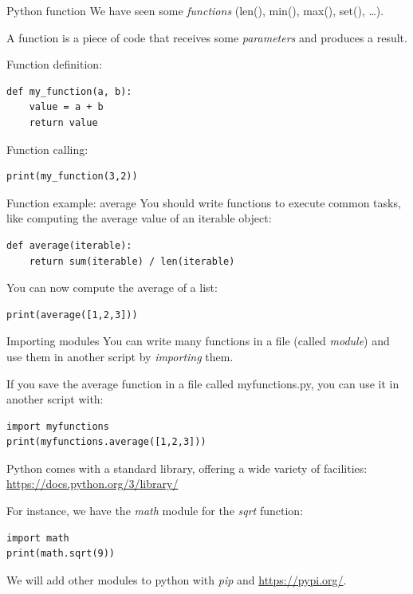 \documentclass[aspectratio=169,handout]{beamer}
\begin{document}
\begin{frame}[fragile]{Python function}
    We have seen some \emph{functions} (len(), min(), max(), set(), \ldots).

    A function is a piece of code that receives some \emph{parameters} and produces a result.

    \begin{minipage}{0.49\textwidth}
        Function definition:
        \begin{verbatim}
def my_function(a, b):
    value = a + b
    return value
        \end{verbatim}
    \end{minipage}
    \begin{minipage}{0.49\textwidth}
        Function calling:
        \begin{verbatim}
print(my_function(3,2))
        \end{verbatim}
    \end{minipage}
\end{frame}

\begin{frame}[fragile]{Function example: average}
    You should write functions to execute common tasks, like computing the average value of an iterable object:

        \begin{verbatim}
def average(iterable):
    return sum(iterable) / len(iterable)
        \end{verbatim}

        You can now compute the average of a list:
        \begin{verbatim}
print(average([1,2,3]))
        \end{verbatim}
\end{frame}

\begin{frame}[fragile]{Importing modules}
    You can write many functions in a file (called \emph{module}) and use them in another script by \emph{importing}
    them.

    If you save the average function in a file called myfunctions.py, you can use it in another script with:
    \begin{verbatim}
import myfunctions
print(myfunctions.average([1,2,3]))
    \end{verbatim}

    Python comes with a standard library, offering a wide variety of facilities:
    \url{https://docs.python.org/3/library/}

    For instance, we have the \emph{math} module for the \emph{sqrt} function:
    \begin{verbatim}
import math
print(math.sqrt(9))
    \end{verbatim}

    We will add other modules to python with \emph{pip} and \url{https://pypi.org/}.
\end{frame}
\end{document}

